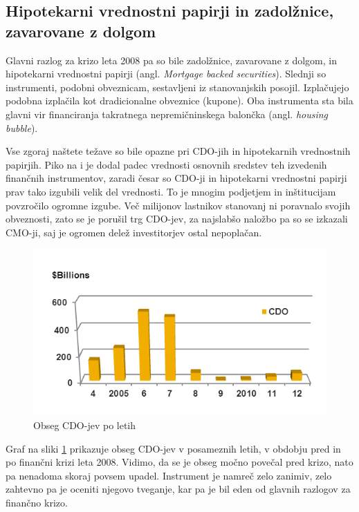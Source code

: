 \documentclass[12pt,a4paper]{amsart}
\theoremstyle{definition} %
\theoremstyle{plain} %
\begin{document}
\subsection{Hipotekarni vrednostni papirji in zadolžnice, zavarovane z dolgom}
Glavni razlog za krizo leta 2008 pa so bile zadolžnice, zavarovane z dolgom, in 
hipotekarni vrednostni papirji (angl. \textit{Mortgage backed securities}). Slednji 
so instrumenti, podobni obveznicam, 
sestavljeni iz stanovanjskih posojil. Izplačujejo podobna izplačila kot dradicionalne 
obveznice (kupone). Oba instrumenta sta bila glavni vir financiranja takratnega 
nepremičninskega balončka (angl. \textit{housing bubble}). 

Vse zgoraj naštete težave so bile opazne pri CDO-jih in hipotekarnih vrednostnih 
papirjih. Piko na i je dodal padec vrednosti osnovnih sredstev teh izvedenih finančnih 
instrumentov, zaradi česar so CDO-ji in hipotekarni vrednostni papirji prav tako izgubili 
velik del vrednosti. To je mnogim podjetjem in inštitucijam povzročilo ogromne izgube. 
Več milijonov lastnikov stanovanj ni poravnalo svojih obveznosti, zato se je porušil 
trg CDO-jev, za najslabšo naložbo pa so se izkazali CMO-ji, saj je ogromen delež 
investitorjev ostal nepoplačan. 

\begin{figure}[h]

\includegraphics[scale=0.8]{CDO.png}
\caption{Obseg CDO-jev po letih}
\label{graf_CDO}
\end{figure}

Graf na sliki \ref{graf_CDO} prikazuje obseg CDO-jev v posameznih letih, v obdobju pred 
in po finančni krizi leta 2008. Vidimo, da se je obseg močno povečal pred krizo, 
nato pa nenadoma skoraj povsem upadel. Instrument je namreč zelo zanimiv, 
zelo zahtevno pa je oceniti njegovo tveganje, kar pa je bil eden od glavnih 
razlogov za finančno krizo.
\end{document}
